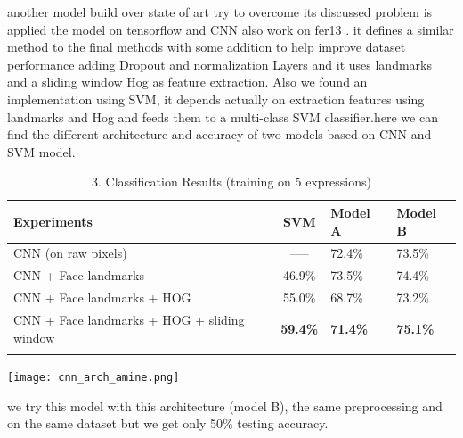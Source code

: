 \large another model build over state of art try to overcome its discussed problem is applied the model on tensorflow and CNN also work on fer13 . it defines a similar method to the final methods with some addition to help improve dataset performance adding Dropout and normalization Layers and it uses landmarks and a sliding window Hog as feature extraction. \newline
Also we found an implementation using SVM, it depends actually on extraction features using landmarks and Hog and feeds them to a multi-class SVM classifier.here we can find the different architecture and accuracy of two models based on CNN and SVM model.

\begin{table}[h!]
	\begin{center}
		\caption{3. Classification Results (training on 5 expressions)\newline}
		\label{tab:table 2.2.2}
		\begin{tabular}{l|c|l|l}
			\textbf{Experiments} & \textbf{SVM}   & \textbf{Model A}   & \textbf{Model B}  \\
			\hline
			CNN (on raw pixels)	& -----   & 72.4\% & 73.5\% \\ 
			CNN + Face landmarks & 46.9\% &	73.5\% & 74.4\% \\
			CNN + Face landmarks + HOG & 55.0\% & 68.7\% & 73.2\% \\
			CNN + Face landmarks + HOG + sliding window & \textbf{59.4\%} &\textbf{71.4\%}&\textbf{75.1\%}\\
		& & 
		\end{tabular}
		
	\end{center}
	\texttt{[image: cnn\_arch\_amine.png]}
\end{table}
\large we try this model with this architecture (model B), the same preprocessing and on the same dataset but we get only 50\% testing accuracy.





